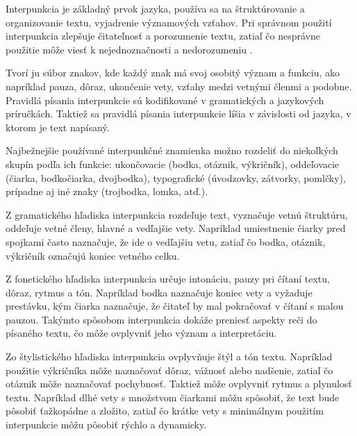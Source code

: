 Interpunkcia je základný prvok jazyka, používa sa na štruktúrovanie a organizovanie textu, vyjadrenie významových vzťahov.
Pri správnom použití interpunkcia zlepšuje čitateľnosť a porozumenie textu, zatiaľ čo nesprávne použitie môže viesť k
nejednoznačnosti a nedorozumeniu \cite{lubis2025mastering}.

Tvorí ju súbor znakov, kde každý znak má svoj osobitý význam a funkciu, ako napríklad pauza, dôraz, ukončenie vety, vzťahy medzi vetnými členmi
a podobne. Pravidlá písania interpunkcie sú kodifikované v gramatických a jazykových príručkách. Taktiež sa pravidlá písania interpunkcie líšia
v závislosti od jazyka, v ktorom je text napísaný.

Najbežnejšie používané interpunkčné znamienka možno rozdeliť do niekoľkých skupín podľa ich funkcie:
ukončovacie (bodka, otáznik, výkričník), oddeľovacie (čiarka, bodkočiarka, dvojbodka), typografické (úvodzovky, zátvorky, pomlčky),
prípadne aj iné znaky (trojbodka, lomka, atď.).

Z gramatického hľadiska interpunkcia rozdeľuje text, vyznačuje vetnú štruktúru, oddeľuje vetné členy, hlavné a vedľajšie vety.
Napríklad umiestnenie čiarky pred spojkami často naznačuje, že ide o vedľajšiu vetu, zatiaľ čo bodka, otáznik, výkričník označujú koniec vetného celku.

Z fonetického hľadiska interpunkcia určuje intonáciu, pauzy pri čítaní textu, dôraz, rytmus a tón. Napríklad bodka naznačuje koniec vety a vyžaduje prestávku,
kým čiarka naznačuje, že čitateľ by mal pokračovať v čítaní s malou pauzou. Takýmto spôsobom interpunkcia dokáže preniesť aspekty reči do písaného textu,
čo môže ovplyvniť jeho význam a interpretáciu.

Zo štylistického hľadiska interpunkcia ovplyvňuje štýl a tón textu. Napríklad použitie výkričníka môže naznačovať dôraz, vážnosť alebo nadšenie, zatiaľ čo otáznik
môže naznačovať pochybnosť. Taktiež môže ovplyvniť rytmus a plynulosť textu. Napríklad dlhé vety s množstvom čiarkami môžu spôsobiť, že text bude pôsobiť ťažkopádne
a zložito, zatiaľ čo krátke vety s minimálnym použitím interpunkcie môžu pôsobiť rýchlo a dynamicky. 